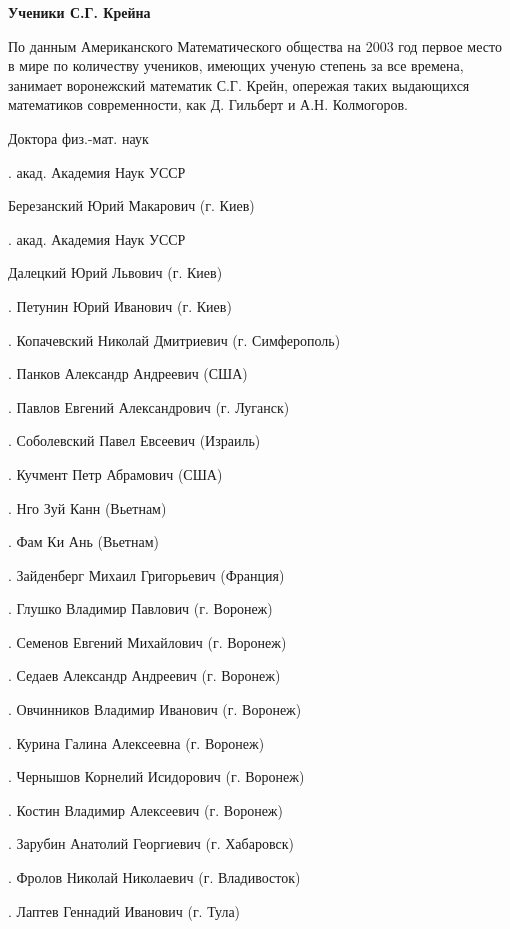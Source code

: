 \begin{center}
{\bf Ученики С.Г. Крейна}
\end{center}

По данным Американского Математического общества на 2003 год первое место в мире по количеству учеников, имеющих ученую степень за все времена, занимает воронежский математик С.Г. Крейн, опережая таких выдающихся математиков современности, как Д. Гильберт и А.Н. Колмогоров.

Доктора физ.-мат. наук

.	акад. Академия Наук УССР \par Березанский Юрий Макарович (г. Киев)

.	акад. Академия Наук УССР \par Далецкий Юрий Львович (г. Киев)

.	Петунин Юрий Иванович (г. Киев)

.	Копачевский Николай Дмитриевич (г. Симферополь)

.	Панков Александр Андреевич (США)

.	Павлов Евгений Александрович (г. Луганск)

.	Соболевский Павел Евсеевич (Израиль)

.	Кучмент Петр Абрамович (США)

.	Нго Зуй Канн (Вьетнам)

.	 Фам Ки Ань (Вьетнам)

.	 Зайденберг Михаил Григорьевич (Франция)

.	 Глушко Владимир Павлович (г. Воронеж)

.	 Семенов Евгений Михайлович (г. Воронеж)

.	 Седаев Александр Андреевич (г. Воронеж)

.	 Овчинников Владимир Иванович (г. Воронеж)

.	 Курина Галина Алексеевна (г. Воронеж)

.	 Чернышов Корнелий Исидорович (г. Воронеж)

.	 Костин Владимир Алексеевич (г. Воронеж)

.	 Зарубин Анатолий Георгиевич (г. Хабаровск)

.	 Фролов Николай Николаевич (г. Владивосток)

.	 Лаптев Геннадий Иванович (г. Тула)

